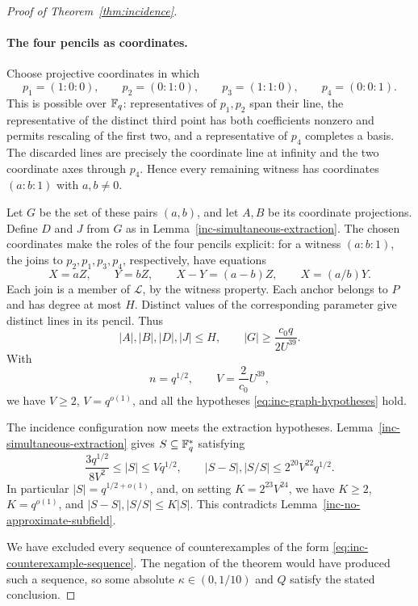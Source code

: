 \begin{proof}[Proof of Theorem~\ref{thm:incidence}]
\paragraph{The four pencils as coordinates.}
Choose projective coordinates in which
\[
 p_1=(1:0:0),\qquad p_2=(0:1:0),\qquad
 p_3=(1:1:0),\qquad p_4=(0:0:1).
\]
This is possible over $\mathbb F_q$: representatives of $p_1,p_2$ span
their line, the representative of the distinct third point has
both coefficients nonzero and permits rescaling of the first two,
and a representative of $p_4$ completes a basis. The discarded
lines are precisely the coordinate line at infinity and the two
coordinate axes through $p_4$. Hence every remaining witness has
coordinates $(a:b:1)$ with $a,b\ne0$.

Let $G$ be the set of these pairs $(a,b)$, and let $A,B$ be its
coordinate projections. Define $D$ and $J$ from $G$ as in
Lemma~\ref{inc-simultaneous-extraction}. The chosen coordinates make
the roles of the four pencils explicit: for a witness $(a:b:1)$,
the joins to $p_2,p_1,p_3,p_4$, respectively, have equations
\[
 X=aZ,\qquad Y=bZ,\qquad
 X-Y=(a-b)Z,\qquad X=(a/b)Y.
\]
Each join is a member of $\mathcal L$, by the witness property.
Each anchor belongs to $P$ and has degree at most $H$.
Distinct values of the corresponding parameter give distinct
lines in its pencil. Thus
\[
 |A|,|B|,|D|,|J|\le H,
 \qquad |G|\ge\frac{c_0q}{2U^{39}}.
\]
With
\begin{equation}\label{eq:inc-graph-parameters}
 n=q^{1/2},\qquad V=\frac{2}{c_0}U^{39},
\end{equation}
we have $V\ge2$, $V=q^{o(1)}$, and all the hypotheses
\eqref{eq:inc-graph-hypotheses} hold.

The incidence configuration now meets the extraction hypotheses.
Lemma~\ref{inc-simultaneous-extraction} gives
$S\subseteq\mathbb F_q^*$ satisfying
\[
 \frac{3q^{1/2}}{8V^2}\le |S|\le Vq^{1/2},\qquad
 |S-S|,|S/S|\le2^{20}V^{22}q^{1/2}.
\]
In particular $|S|=q^{1/2+o(1)}$, and, on setting
$K=2^{23}V^{24}$, we have $K\ge2$, $K=q^{o(1)}$, and
$|S-S|,|S/S|\le K|S|$. This contradicts
Lemma~\ref{inc-no-approximate-subfield}.

We have excluded every sequence of counterexamples of the form
\eqref{eq:inc-counterexample-sequence}. The negation of the theorem
would have produced such a sequence, so some absolute
$\kappa\in(0,1/10)$ and $Q$ satisfy the stated conclusion.
\end{proof}
